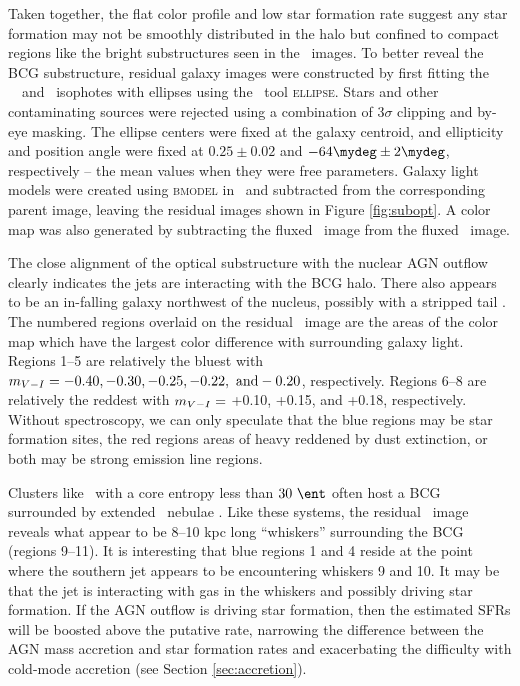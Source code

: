 \documentclass[11pt, preprint]{aastex}
\begin{document}
Taken together, the flat color profile and low star formation rate
suggest any star formation may not be smoothly distributed in the halo
but confined to compact regions like the bright substructures seen in
the \hst\ images. To better reveal the BCG substructure, residual
galaxy images were constructed by first fitting the \hst\ \myv\ and
\myi\ isophotes with ellipses using the \iraf\ tool
                {\textsc{ellipse}}. Stars and other contaminating
                sources were rejected using a combination of $3\sigma$
                clipping and by-eye masking. The ellipse centers were
                fixed at the galaxy centroid, and ellipticity and
                position angle were fixed at $0.25 \pm 0.02$ and
                $-64\mydeg \pm 2\mydeg$, respectively -- the mean
                values when they were free parameters. Galaxy light
                models were created using {\textsc{bmodel}} in
                \iraf\ and subtracted from the corresponding parent
                image, leaving the residual images shown in Figure
                \ref{fig:subopt}. A color map was also generated by
                subtracting the fluxed \myi\ image from the fluxed
                \myv\ image.

The close alignment of the optical substructure with the nuclear AGN
outflow clearly indicates the jets are interacting with the BCG
halo. There also appears to be an in-falling galaxy northwest of the
nucleus, possibly with a stripped tail \citep[see][for
  example]{2007ApJ...671..190S}. The numbered regions overlaid on the
residual \myv\ image are the areas of the color map which have the
largest color difference with surrounding galaxy light. Regions 1--5
are relatively the bluest with $m_{V-I} = -0.40, -0.30, -0.25,
-0.22, ~\rm{and} -0.20$, respectively. Regions 6--8 are relatively the
reddest with $m_{V-I} =$ +0.10, +0.15, and +0.18,
respectively. Without spectroscopy, we can only speculate that the
blue regions may be star formation sites, the red regions areas of
heavy reddened by dust extinction, or both may be strong emission line
regions.

Clusters like \rbs\ with a core entropy less than $30 ~\ent$ often
host a BCG surrounded by extended \halpha\ nebulae
\citep[\eg][]{mcdonald10}. Like these systems, the residual
\myi\ image reveals what appear to be 8--10 kpc long ``whiskers''
surrounding the BCG (regions 9--11). It is interesting that blue
regions 1 and 4 reside at the point where the southern jet appears to
be encountering whiskers 9 and 10. It may be that the jet is
interacting with gas in the whiskers and possibly driving star
formation. If the AGN outflow is driving star formation, then the
estimated SFRs will be boosted above the putative rate, narrowing the
difference between the AGN mass accretion and star formation rates and
exacerbating the difficulty with cold-mode accretion (see Section
\ref{sec:accretion}).
\end{document}
